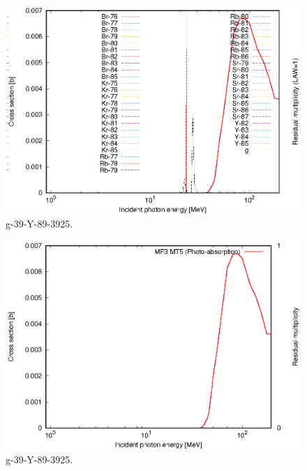 \begin{figure}
 \includegraphics[width=\linewidth]{eps/g_39-Y-89_3925.eps}
  \caption{g-39-Y-89-3925.}
\end{figure}
\begin{figure}
 \includegraphics[width=\linewidth]{eps-law0/g_39-Y-89_3925.eps}
 \caption{g-39-Y-89-3925.}
\end{figure}
\newpage \clearpage

